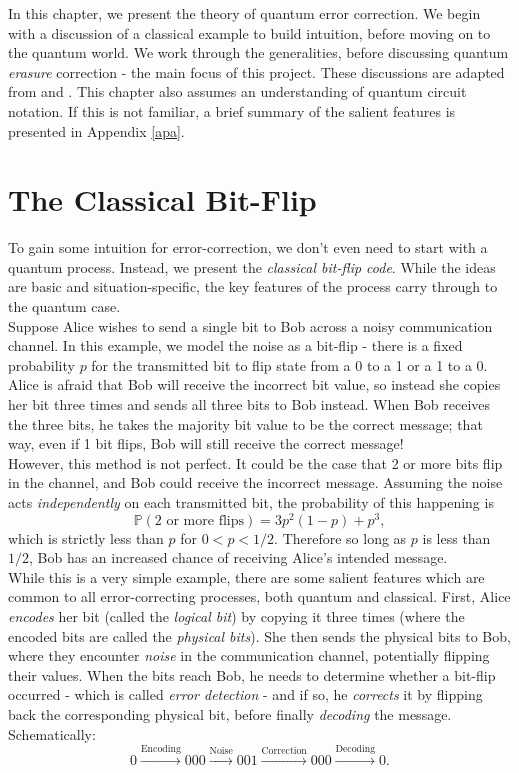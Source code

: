 \documentclass[12pt,a4paper]{report}
\numberwithin{equation}{section}
\theoremstyle{definition}
\theoremstyle{theorem}
\theoremstyle{theorem}
\theoremstyle{example}
\theoremstyle{definition}
\begin{document}
In this chapter, we present the theory of quantum error correction. We begin with a discussion of a classical example to build intuition, before moving on to the quantum world. We work through the generalities, before discussing quantum \textit{erasure} correction - the main focus of this project. These discussions are adapted from \cite{NielsenChuang} and \cite{Harlow}. This chapter also assumes an understanding of quantum circuit notation. If this is not familiar, a brief summary of the salient features is presented in Appendix \ref{apa}.

\section{The Classical Bit-Flip}
To gain some intuition for error-correction, we don't even need to start with a quantum process. Instead, we present the \textit{classical bit-flip code}. While the ideas are basic and situation-specific, the key features of the process carry through to the quantum case.\\
Suppose Alice wishes to send a single bit to Bob across a noisy communication channel. In this example, we model the noise as a bit-flip - there is a fixed probability $p$ for the transmitted bit to flip state from a 0 to a 1 or a 1 to a 0. Alice is afraid that Bob will receive the incorrect bit value, so instead she copies her bit three times and sends all three bits to Bob instead. When Bob receives the three bits, he takes the majority bit value to be the correct message; that way, even if 1 bit flips, Bob will still receive the correct message!\\
However, this method is not perfect. It could be the case that 2 or more bits flip in the channel, and Bob could receive the incorrect message. Assuming the noise acts \textit{independently} on each transmitted bit, the probability of this happening is
\begin{equation}
	\mathbb{P}(\text{2 or more flips})=3p^{2}(1-p)+p^{3},
\end{equation}
which is strictly less than $p$ for $0<p<1/2$. Therefore so long as $p$ is less than $1/2$, Bob has an increased chance of receiving Alice's intended message.\\
While this is a very simple example, there are some salient features which are common to all error-correcting processes, both quantum and classical. First, Alice \textit{encodes} her bit (called the \textit{logical bit}) by copying it three times (where the encoded bits are called the \textit{physical bits}). She then sends the physical bits to Bob, where they encounter \textit{noise} in the communication channel, potentially flipping their values. When the bits reach Bob, he needs to determine whether a bit-flip occurred - which is called \textit{error detection} - and if so, he \textit{corrects} it by flipping back the corresponding physical bit, before finally \textit{decoding} the message. Schematically:
\begin{equation*}
	0\xrightarrow{\text{Encoding}}000\xrightarrow{\text{Noise}}001\xrightarrow{\text{Correction}}000\xrightarrow{\text{Decoding}}0.
\end{equation*}
\end{document}
